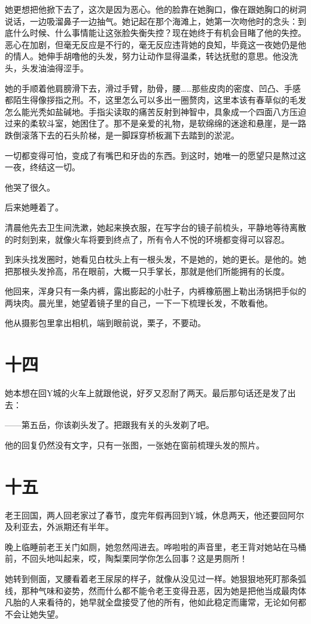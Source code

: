 \documentclass[lang=cn,newtx,12pt,scheme=chinese]{elegantbook}
\begin{document}
她更想把他掀下去了，这次是因为恶心。他的脸靠在她胸口，像在跟她胸口的树洞说话，一边吸溜鼻子一边抽气。她记起在那个海滩上，她第一次吻他时的念头：到底什么时候、什么事情能让这张脸失衡失控？现在她终于有机会目睹了他的失控。恶心在加剧，但毫无反应是不行的，毫无反应违背她的良知，毕竟这一夜她仍是他的情人。她伸手胡噜他的头发，努力让动作显得温柔，转达抚慰的意思。他没洗头，头发油油得涩手。

她的手顺着他肩膀滑下去，滑过手臂，肋骨，腰……那些皮肉的密度、凹凸、手感都陌生得像拶指之刑。不，这里怎么可以多出一圈赘肉，这里本该有春草似的毛发怎么能光秃如盐碱地。手指尖读取的痛苦反射到神智中，具象成一个四面八方压迫过来的柔软斗室，她困住了。那不是亲爱的礼物，是软绵绵的迷途和悬崖，是一路跌倒滚落下去的石头阶梯，是一脚踩穿桥板漏下去踏到的淤泥。

一切都变得可怕，变成了有嘴巴和牙齿的东西。到这时，她唯一的愿望只是熬过这一夜，终结这一切。

他哭了很久。

后来她睡着了。

清晨他先去卫生间洗漱，她起来换衣服，在写字台的镜子前梳头，平静地等待离散的时刻到来，就像火车将要到终点了，所有令人不悦的环境都变得可以容忍。

到床头找发圈时，她看见白枕头上有一根头发，不是她的，她的更长。是他的。她把那根头发拎高，吊在眼前，大概一只手掌长，那就是他们所能拥有的长度。

他回来，浑身只有一条内裤，露出膨起的小肚子，内裤橡筋圈上勒出汤锅把手似的两块肉。晨光里，她望着镜子里的自己，一下一下梳理长发，不敢看他。

他从摄影包里拿出相机，端到眼前说，栗子，不要动。
\section{十四}
她本想在回Y城的火车上就跟他说，好歹又忍耐了两天。最后那句话还是发了出去：

——第五岳，你该剃头发了。把跟我有关的头发剃了吧。

他的回复仍然没有文字，只有一张图，一张她在窗前梳理头发的照片。
\section{十五}
老王回国，两人回老家过了春节，度完年假再回到Y城，休息两天，他还要回阿尔及利亚去，外派期还有半年。

晚上临睡前老王关门如厕，她忽然闯进去。哗啦啦的声音里，老王背对她站在马桶前，不回头地叫起来，哎，陶梨栗同学你怎么回事？这是男厕所！

她转到侧面，叉腰看着老王尿尿的样子，就像从没见过一样。她狠狠地死盯那条弧线，那种气味和姿势，然而什么都不能令老王变得丑恶，因为她是把他当成最肉体凡胎的人来看待的，她早就全盘接受了他的所有，他如此稳定而庸常，无论如何都不会让她失望。
\end{document}
